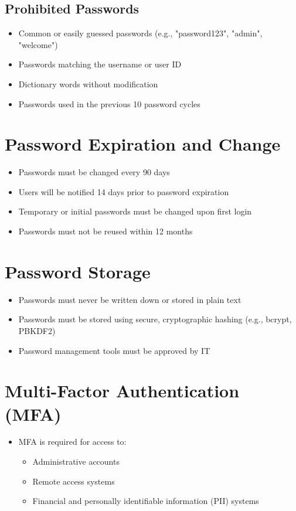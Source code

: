 \subsection{Prohibited Passwords}
\begin{itemize}
    \item Common or easily guessed passwords (e.g., "password123", "admin", "welcome")
    \item Passwords matching the username or user ID
    \item Dictionary words without modification
    \item Passwords used in the previous 10 password cycles
\end{itemize}

\section{Password Expiration and Change}
\begin{itemize}
    \item Passwords must be changed every 90 days
    \item Users will be notified 14 days prior to password expiration
    \item Temporary or initial passwords must be changed upon first login
    \item Passwords must not be reused within 12 months
\end{itemize}

\section{Password Storage}
\begin{itemize}
    \item Passwords must never be written down or stored in plain text
    \item Passwords must be stored using secure, cryptographic hashing (e.g., bcrypt, PBKDF2)
    \item Password management tools must be approved by IT
\end{itemize}

\section{Multi-Factor Authentication (MFA)}
\begin{itemize}
    \item MFA is required for access to:
    \begin{itemize}
        \item Administrative accounts
        \item Remote access systems
        \item Financial and personally identifiable information (PII) systems
    \end{itemize}
\end{itemize}

